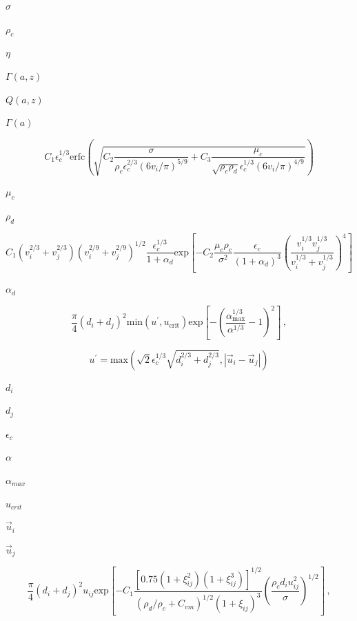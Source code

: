 \documentclass{article}
\begin{document}
$        \sigma      $
\pagebreak

$        \rho_c      $
\pagebreak

$        \eta        $
\pagebreak

$        \Gamma(a,z) $
\pagebreak

$        Q(a,z)      $
\pagebreak

$        \Gamma(a)   $
\pagebreak

\[
    C_1 \epsilon_c^{1/3}
    \mathrm{erfc}
    \left(
        \sqrt
        {
            C_2 \frac{\sigma}{\rho_c \epsilon_c^{2/3} (6v_i/\pi)^{5/9}}
          + C_3 \frac{\mu_c}{\sqrt{\rho_c \rho_d}
            \epsilon_c^{1/3} (6v_i/\pi)^{4/9}}
        }
    \right)
\]
\pagebreak

$        \mu_c       $
\pagebreak

$        \rho_d      $
\pagebreak

\[
    C_1 (v_i^{2/3} + v_j^{2/3}) (v_i^{2/9} + v_j^{2/9})^{1/2}
    \frac{\epsilon_c^{1/3}}{1 + \alpha_d}
    \textrm{exp}
    \left[
      - C_2 \frac{\mu_c \rho_c}{\sigma^2}
        \frac{\epsilon_c}{(1 + \alpha_d)^{3}}
        \left(
            \frac{v_i^{1/3} v_j^{1/3}}{v_i^{1/3} + v_j^{1/3}}
        \right)^{4}
    \right]
\]
\pagebreak

$        \alpha_d    $
\pagebreak

\[
    \frac{\pi}{4} (d_i + d_j)^2 \mathrm{min}(u^{\prime}, u_{\mathrm{crit}})
    \mathrm{exp}
    \left[
      - \left(\frac{\alpha_{\mathrm{max}}^{1/3}}{\alpha^{1/3}} - 1\right)^2
    \right]\,,
\]
\pagebreak

\[
    u^{\prime}
  =
    \mathrm{max}
    \left(
        \sqrt{2} \epsilon_c^{1/3} \sqrt{d_i^{2/3} + d_j^{2/3}},
        |\vec{u}_i - \vec{u}_j|
    \right)
\]
\pagebreak

$        d_i           $
\pagebreak

$        d_j           $
\pagebreak

$        \epsilon_c    $
\pagebreak

$        \alpha        $
\pagebreak

$        \alpha_{max}  $
\pagebreak

$        u_{crit}      $
\pagebreak

$        \vec{u}_i     $
\pagebreak

$        \vec{u}_j     $
\pagebreak

\[
    \frac{\pi}{4} (d_i + d_j)^2 u_{ij}
    \mathrm{exp}
    \left[
      - C_1
        \frac
        {[0.75(1 + \xi_{ij}^2)(1 + \xi_{ij}^3)]^{1/2}}
        {(\rho_d/\rho_c + C_{vm})^{1/2} (1 + \xi_{ij})^3}
        \left(\frac{\rho_c d_i u_{ij}^2}{\sigma}\right)^{1/2}
    \right]\,,
\]
\pagebreak
\end{document}

